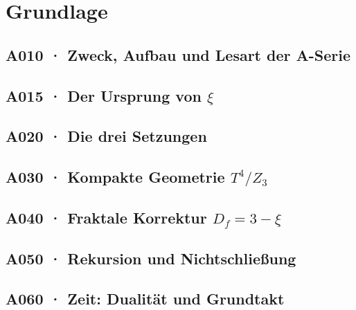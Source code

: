 \documentclass[11pt,twoside,openright]{book}
\begin{document}
\tableofcontents
\clearpage

\part{Grundlage}

\chapter[A010 · Zweck und Aufbau]{A010 · Zweck, Aufbau und Lesart der A-Serie}


\chapter[A015 · Ursprung von $\xi$]{A015 · Der Ursprung von $\xi$}


\chapter[A020 · Die drei Setzungen]{A020 · Die drei Setzungen}


\chapter[A030 · Kompakte Geometrie $T^4/Z_3$]{A030 · Kompakte Geometrie $T^4/Z_3$}


\chapter[A040 · Fraktale Korrektur]{A040 · Fraktale Korrektur $D_f = 3{-}\xi$}


\chapter[A050 · Rekursion und Nichtschließung]{A050 · Rekursion und Nichtschließung}


\chapter[A060 · Zeit: Dualität und Grundtakt]{A060 · Zeit: Dualität und Grundtakt}

\end{document}
